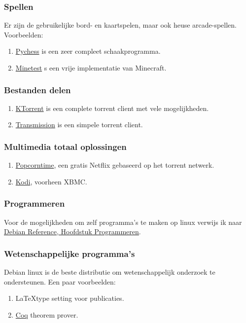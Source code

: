 \subsubsection{Spellen}
Er zijn de gebruikelijke bord- en kaartspelen, maar ook heuse arcade-spellen. Voorbeelden:
\begin{enumerate}
	\item \href{http://pychess.org/}{Pychess} is een zeer compleet schaakprogramma.
	\item \href{http://www.minetest.net/}{Minetest} s een vrije implementatie van Minecraft.
\end{enumerate}

\subsubsection{Bestanden delen}
\begin{enumerate}
	\item \href{http://www.ktorrent.org/}{KTorrent} is een complete torrent client met vele mogelijkheden.
	\item \href{https://www.transmissionbt.com/}{Transmission} is een simpele torrent client.
\end{enumerate}

\subsubsection{Multimedia totaal oplossingen}
\begin{enumerate}
	\item \href{http://popcorntime.io/}{Popcorntime}, een gratis Netflix gebaseerd op het torrent netwerk.
		\item \href{http://kodi.tv/}{Kodi}, voorheen XBMC.
\end{enumerate}

\subsubsection{Programmeren}
Voor de mogelijkheden om zelf programma's te maken op linux verwijs ik naar \href{https://www.debian.org/doc/manuals/debian-reference/ch12.en.html}{Debian Reference, Hoofdstuk Programmeren}.

\subsubsection{Wetenschappelijke programma's}
Debian linux is de beste distributie om wetenschappelijk onderzoek te ondersteunen. Een paar voorbeelden:

\begin{enumerate}
	\item \LaTeX type setting voor publicaties.
	\item \href{https://coq.inria.fr/}{Coq} theorem prover.
\end{enumerate}

